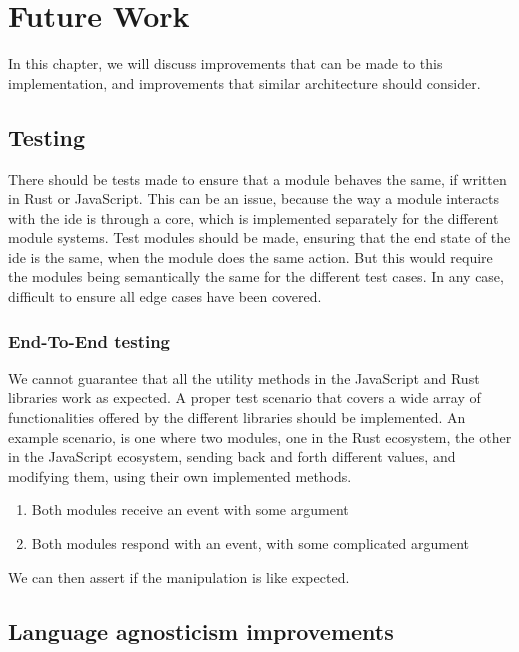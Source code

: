 \chapter{Future Work} \label{cha:future}

In this chapter, we will discuss improvements that can be made to this
implementation, and improvements that similar architecture should
consider.

\section{Testing}

There should be tests made to ensure that a module behaves the same, if written
in Rust or JavaScript. This can be an issue, because the way a module interacts
with the \gls*{ide} is through a core, which is implemented separately for the
different module systems. Test modules should be made, ensuring that the end
state of the \gls*{ide} is the same, when the module does the same action. But
this would require the modules being semantically the same for the different
test cases. In any case, difficult to ensure all edge cases have been covered.

\subsection{End-To-End testing}

We cannot guarantee that all the utility methods in the JavaScript and Rust
libraries work as expected. A proper test scenario that covers a wide array of
functionalities offered by the different libraries should be implemented. An
example scenario, is one where two modules, one in the Rust ecosystem, the other
in the JavaScript ecosystem, sending back and forth different values, and
modifying them, using their own implemented methods.

\begin{enumerate}
  \item Both modules receive an event with some argument
  \item Both modules respond with an event, with some complicated argument
\end{enumerate}

We can then assert if the manipulation is like expected.

\section{Language agnosticism improvements}

